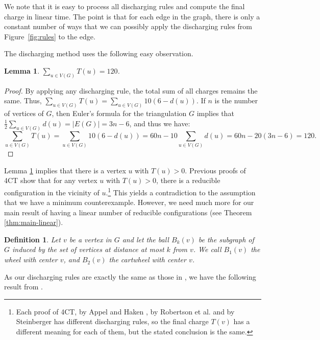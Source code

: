 \documentclass[10pt,a4paper]{article}
\newtheorem{lem}[thm]{Lemma}
\newtheorem{dfn}[thm]{Definition}
\def\showlabel#1{}
\begin{document}
We note that it is easy to process all discharging rules and compute the final charge in linear time. The point is that for each edge in the graph, there is only a constant number of ways that we can possibly apply the discharging rules from Figure~\ref{fig:rules} to the edge.


The discharging method uses the following easy observation.

\begin{lem}
\label{lem:120}\showlabel{lem:120}
$\sum_{u \in V(G)} T(u) = 120$.
\end{lem}

\begin{proof}
By applying any discharging rule, the total sum of all charges remains the same. Thus, $\sum_{u \in V(G)} T(u) = \sum_{u \in V(G)} 10(6-d(u))$. If $n$ is the number of vertices of $G$, then Euler's formula for the triangulation $G$ implies that $\tfrac12 \sum_{u\in V(G)}d(u) = |E(G)| = 3n - 6$, and thus we have:
 \[
 \sum_{u \in V(G)} T(u) = \sum_{u \in V(G)} 10(6-d(u)) = 60n - 10\sum_{u \in V(G)}d(u) =
 60n-20(3n-6) = 120.
 \]
\end{proof}

Lemma \ref{lem:120} implies that there is a vertex $u$ with $T(u) > 0$. Previous proofs of 4CT show that for any vertex $u$ with $T(u)>0$, there is a reducible configuration in the vicinity of $u$.\footnote{Each proof of 4CT, by Appel and Haken \cite{AppelHaken89}, by Robertson et al. \cite{RSST} and by Steinberger \cite{steinberger2010unavoidable} has different discharging rules, so the final charge $T(v)$ has a different meaning for each of them, but the stated conclusion is the same.} This yields a contradiction to the assumption that we have a minimum counterexample.
However, we need much more for our main result of having a linear number of reducible configurations (see Theorem \ref{thm:main-linear}).

\begin{dfn}\label{def:B_2}
    Let $v$ be a vertex in $G$ and let the \emph{ball} $B_k(v)$ be the subgraph of $G$ induced by the set of vertices at distance at most $k$ from $v$. We call 
    $B_1(v)$ the \emph{wheel} with \emph{center} $v$, and
    $B_2(v)$ the \emph{cartwheel} with \emph{center}  $v$.
\end{dfn}





As our discharging rules are exactly the same as those in \cite{steinberger2010unavoidable}, we have the following result from \cite{steinberger2010unavoidable}.
\end{document}
